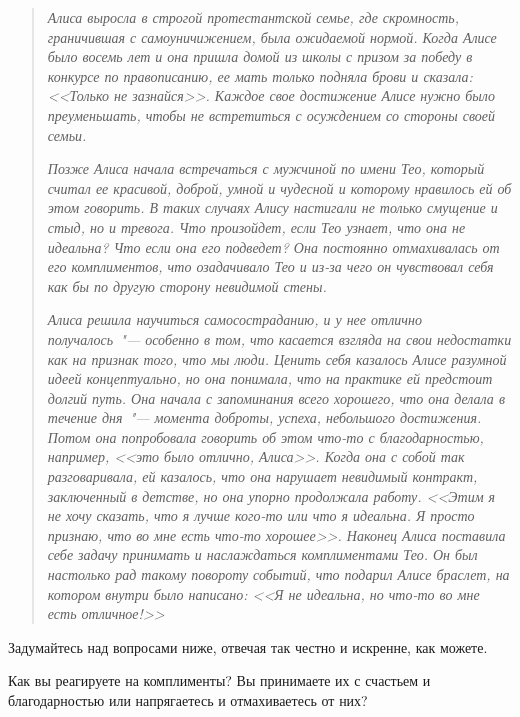 \begin{quotation}
	\textit{
		Алиса выросла в строгой протестантской семье, где скромность, граничившая с самоуничижением, была ожидаемой нормой. Когда Алисе было восемь лет и она пришла домой из школы с призом за победу в конкурсе по правописанию, ее мать только подняла брови и сказала: <<Только не зазнайся>>. Каждое свое достижение Алисе нужно было преуменьшать, чтобы не встретиться с осуждением со стороны своей семьи.
	} 
	
	\textit{
		Позже Алиса начала встречаться с мужчиной по имени Тео, который считал ее красивой, доброй, умной и чудесной и которому нравилось ей об этом говорить. В таких случаях Алису настигали не только смущение и стыд, но и тревога. Что произойдет, если Тео узнает, что она не идеальна? Что если она его подведет? Она постоянно отмахивалась от его комплиментов, что озадачивало Тео и из-за чего он чувствовал себя как бы по другую сторону невидимой стены.
	}
	
	\textit{
		Алиса решила научиться самосостраданию, и у нее отлично получалось~"--- особенно в том, что касается взгляда на свои недостатки как на признак того, что мы люди. Ценить себя казалось Алисе разумной идеей концептуально, но она понимала, что на практике ей предстоит долгий путь. Она начала с запоминания всего хорошего, что она делала в течение дня~"--- момента доброты, успеха, небольшого достижения. Потом она попробовала говорить об этом что-то с благодарностью, например, <<это было отлично, Алиса>>. Когда она с собой так разговаривала, ей казалось, что она нарушает невидимый контракт, заключенный в детстве, но она упорно продолжала работу. <<Этим я не хочу сказать, что я лучше кого-то или что я идеальна. Я просто признаю, что во мне есть что-то хорошее>>. Наконец Алиса поставила себе задачу принимать и наслаждаться комплиментами Тео. Он был настолько рад такому повороту событий, что подарил Алисе браслет, на котором внутри было написано: <<Я не идеальна, но что-то во мне есть отличное!>>
	} 
\end{quotation}

\newpage
{} \label{Ex:How_Do_I_Relate_to_My_Good_Qualities?}

Задумайтесь над вопросами ниже, отвечая так честно и искренне, как можете.

\begin{itemize}
	\itemWritingHand Как вы реагируете на комплименты? Вы принимаете их с счастьем и благодарностью или напрягаетесь и отмахиваетесь от них?
\end{itemize}

